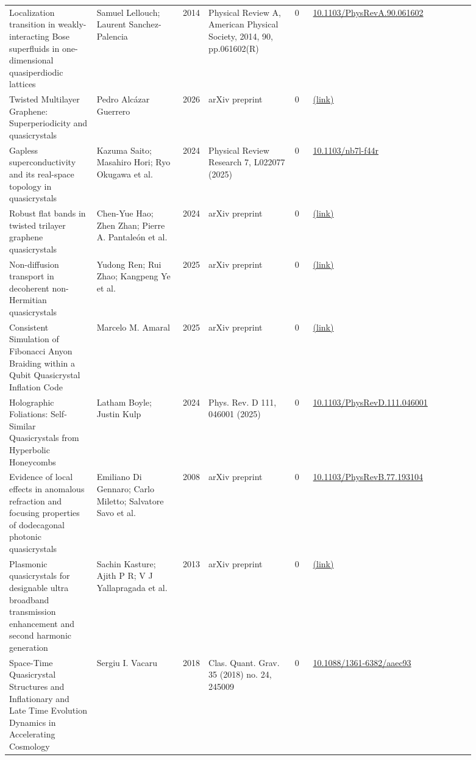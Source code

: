 \documentclass[10pt,a4paper]{article}
\begin{document}
{\begin{longtable}{p{0.192\linewidth}p{0.192\linewidth}p{0.043\linewidth}p{0.192\linewidth}p{0.043\linewidth}p{0.132\linewidth}p{0.096\linewidth}}
Localization transition in weakly-interacting Bose superfluids in one-dimensional quasiperdiodic lattices & Samuel Lellouch; Laurent Sanchez-Palencia & 2014 & Physical Review A, American Physical Society, 2014, 90, pp.061602(R) & 0 & \href{https://doi.org/10.1103/PhysRevA.90.061602}{10.1103/PhysRevA.90.061602} &  \\
Twisted Multilayer Graphene: Superperiodicity and quasicrystals & Pedro Alcázar Guerrero & 2026 & arXiv preprint & 0 & \href{http://arxiv.org/abs/2607.25411v1}{(link)} &  \\
Gapless superconductivity and its real-space topology in quasicrystals & Kazuma Saito; Masahiro Hori; Ryo Okugawa et al. & 2024 & Physical Review Research 7, L022077 (2025) & 0 & \href{https://doi.org/10.1103/nb7l-f44r}{10.1103/nb7l-f44r} &  \\
Robust flat bands in twisted trilayer graphene quasicrystals & Chen-Yue Hao; Zhen Zhan; Pierre A. Pantaleón et al. & 2024 & arXiv preprint & 0 & \href{http://arxiv.org/abs/2401.09010v1}{(link)} &  \\
Non-diffusion transport in decoherent non-Hermitian quasicrystals & Yudong Ren; Rui Zhao; Kangpeng Ye et al. & 2025 & arXiv preprint & 0 & \href{http://arxiv.org/abs/2505.04205v2}{(link)} &  \\
Consistent Simulation of Fibonacci Anyon Braiding within a Qubit Quasicrystal Inflation Code & Marcelo M. Amaral & 2025 & arXiv preprint & 0 & \href{http://arxiv.org/abs/2506.21643v1}{(link)} &  \\
Holographic Foliations: Self-Similar Quasicrystals from Hyperbolic Honeycombs & Latham Boyle; Justin Kulp & 2024 & Phys. Rev. D 111, 046001 (2025) & 0 & \href{https://doi.org/10.1103/PhysRevD.111.046001}{10.1103/PhysRevD.111.046001} &  \\
Evidence of local effects in anomalous refraction and focusing properties of dodecagonal photonic quasicrystals & Emiliano Di Gennaro; Carlo Miletto; Salvatore Savo et al. & 2008 & arXiv preprint & 0 & \href{https://doi.org/10.1103/PhysRevB.77.193104}{10.1103/PhysRevB.77.193104} &  \\
Plasmonic quasicrystals for designable ultra broadband transmission enhancement and second harmonic generation & Sachin Kasture; Ajith P R; V J Yallapragada et al. & 2013 & arXiv preprint & 0 & \href{http://arxiv.org/abs/1309.3286v1}{(link)} &  \\
Space-Time Quasicrystal Structures and Inflationary and Late Time Evolution Dynamics in Accelerating Cosmology & Sergiu I. Vacaru & 2018 & Clas. Quant. Grav. 35 (2018) no. 24, 245009 & 0 & \href{https://doi.org/10.1088/1361-6382/aaec93}{10.1088/1361-6382/aaec93} &  \\

\end{longtable}}
\end{document}
